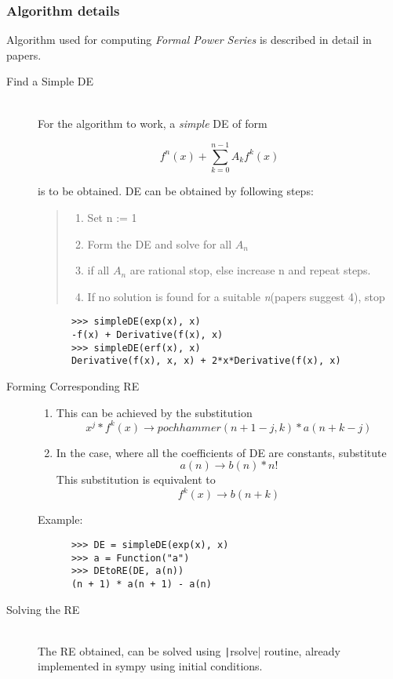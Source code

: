 \documentclass[a4paper,12pt]{article}
\newcommand{\pyline}[1]{\texttt|#1|}
\begin{document}
\subsubsection{Algorithm details}

Algorithm used for computing \emph{Formal Power Series} is described in detail in
papers\cite{gruntzkoepf}\cite{koepf}.

\begin{description}
  \item [Find a Simple DE]\hfill\\
    For the algorithm to work, a \textit{simple} DE of form

    $$f^n(x) + \sum\limits_{k=0}^{n-1} A_{k} f^k(x)$$

    is to be obtained. DE can be obtained by following steps:
    \begin{quote}
      \begin{enumerate}
        \item Set n := 1
        \item Form the DE and solve for all $A_{n}$
        \item if all $A_{n}$ are rational stop, else increase n and repeat steps.
        \item If no solution is found for a suitable \textit{n}(papers
          suggest 4), stop
      \end{enumerate}
    \end{quote}
    \begin{verbatim}
      >>> simpleDE(exp(x), x)
      -f(x) + Derivative(f(x), x)
      >>> simpleDE(erf(x), x)
      Derivative(f(x), x, x) + 2*x*Derivative(f(x), x)
    \end{verbatim}
  \item [Forming Corresponding RE]\hfill
    \begin{enumerate}
      \item This can be achieved by the substitution
        $$x^j * f^k(x) \to pochhammer(n+1-j, k) * a(n+k-j)$$
      \item In the case, where all the coefficients of DE are constants, substitute
        $$a(n) \to b(n) * n!$$
        This substitution is equivalent to
        $$f^k(x) \to b(n+k)$$
    \end{enumerate}
    Example:
    \begin{verbatim}
      >>> DE = simpleDE(exp(x), x)
      >>> a = Function("a")
      >>> DEtoRE(DE, a(n))
      (n + 1) * a(n + 1) - a(n)
    \end{verbatim}
  \item [Solving the RE]\hfill\\
    The RE obtained, can be solved using \pyline{rsolve} routine, already implemented in sympy using initial conditions.
\end{description}
\end{document}
